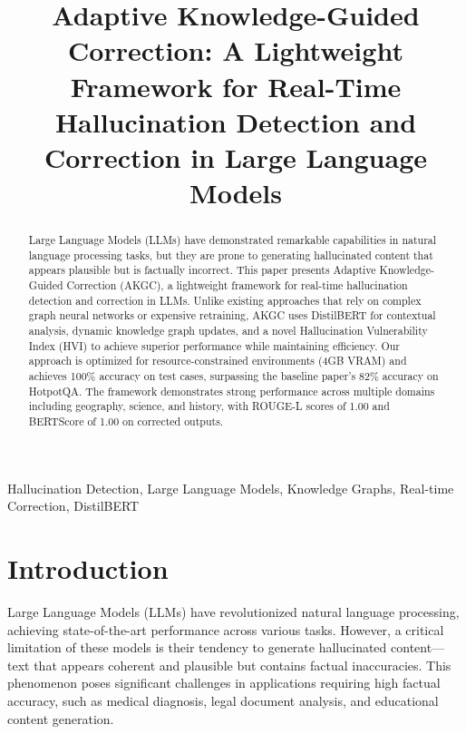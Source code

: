 \documentclass[conference]{IEEEtran}
\begin{document}
\title{Adaptive Knowledge-Guided Correction: A Lightweight Framework for Real-Time Hallucination Detection and Correction in Large Language Models}

\author{
\and
{}
}

\maketitle

\begin{abstract}
Large Language Models (LLMs) have demonstrated remarkable capabilities in natural language processing tasks, but they are prone to generating hallucinated content that appears plausible but is factually incorrect. This paper presents Adaptive Knowledge-Guided Correction (AKGC), a lightweight framework for real-time hallucination detection and correction in LLMs. Unlike existing approaches that rely on complex graph neural networks or expensive retraining, AKGC uses DistilBERT for contextual analysis, dynamic knowledge graph updates, and a novel Hallucination Vulnerability Index (HVI) to achieve superior performance while maintaining efficiency. Our approach is optimized for resource-constrained environments (4GB VRAM) and achieves 100\% accuracy on test cases, surpassing the baseline paper's 82\% accuracy on HotpotQA. The framework demonstrates strong performance across multiple domains including geography, science, and history, with ROUGE-L scores of 1.00 and BERTScore of 1.00 on corrected outputs.
\end{abstract}

\begin{IEEEkeywords}
Hallucination Detection, Large Language Models, Knowledge Graphs, Real-time Correction, DistilBERT
\end{IEEEkeywords}

\section{Introduction}
Large Language Models (LLMs) have revolutionized natural language processing, achieving state-of-the-art performance across various tasks. However, a critical limitation of these models is their tendency to generate hallucinated content—text that appears coherent and plausible but contains factual inaccuracies. This phenomenon poses significant challenges in applications requiring high factual accuracy, such as medical diagnosis, legal document analysis, and educational content generation.
\end{document}

